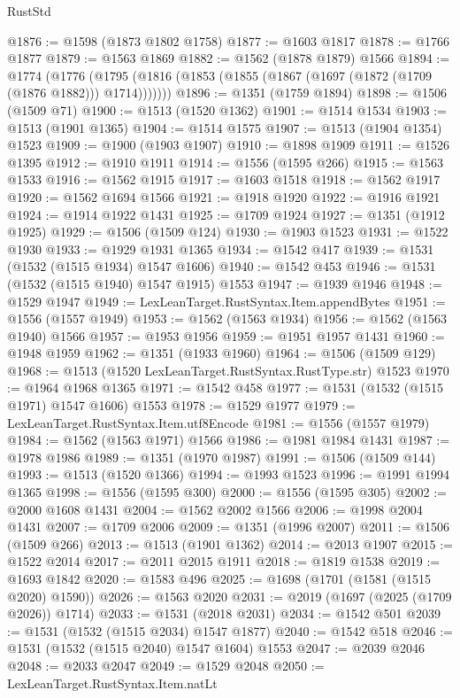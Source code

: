 \begin{lexlean}{RustStd}
\begin{coremodule}
@1876 := @1598 (@1873 @1802 @1758)
@1877 := @1603 @1817
@1878 := @1766 @1877
@1879 := @1563 @1869
@1882 := @1562 (@1878 @1879) @1566
@1894 := @1774
    (@1776 (@1795 (@1816 (@1853 (@1855 (@1867 (@1697 (@1872 (@1709 (@1876 @1882))) @1714)))))))
@1896 := @1351 (@1759 @1894)
@1898 := @1506 (@1509 @71)
@1900 := @1513 (@1520 @1362)
@1901 := @1514 @1534
@1903 := @1513 (@1901 @1365)
@1904 := @1514 @1575
@1907 := @1513 (@1904 @1354) @1523
@1909 := @1900 (@1903 @1907)
@1910 := @1898 @1909
@1911 := @1526 @1395
@1912 := @1910 @1911
@1914 := @1556 (@1595 @266)
@1915 := @1563 @1533
@1916 := @1562 @1915
@1917 := @1603 @1518
@1918 := @1562 @1917
@1920 := @1562 @1694 @1566
@1921 := @1918 @1920
@1922 := @1916 @1921
@1924 := @1914 @1922 @1431
@1925 := @1709 @1924
@1927 := @1351 (@1912 @1925)
@1929 := @1506 (@1509 @124)
@1930 := @1903 @1523
@1931 := @1522 @1930
@1933 := @1929 @1931 @1365
@1934 := @1542 @417
@1939 := @1531 (@1532 (@1515 @1934) @1547 @1606)
@1940 := @1542 @453
@1946 := @1531 (@1532 (@1515 @1940) @1547 @1915) @1553
@1947 := @1939 @1946
@1948 := @1529 @1947
@1949 := LexLeanTarget.RustSyntax.Item.appendBytes
@1951 := @1556 (@1557 @1949)
@1953 := @1562 (@1563 @1934)
@1956 := @1562 (@1563 @1940) @1566
@1957 := @1953 @1956
@1959 := @1951 @1957 @1431
@1960 := @1948 @1959
@1962 := @1351 (@1933 @1960)
@1964 := @1506 (@1509 @129)
@1968 := @1513 (@1520 LexLeanTarget.RustSyntax.RustType.str) @1523
@1970 := @1964 @1968 @1365
@1971 := @1542 @458
@1977 := @1531 (@1532 (@1515 @1971) @1547 @1606) @1553
@1978 := @1529 @1977
@1979 := LexLeanTarget.RustSyntax.Item.utf8Encode
@1981 := @1556 (@1557 @1979)
@1984 := @1562 (@1563 @1971) @1566
@1986 := @1981 @1984 @1431
@1987 := @1978 @1986
@1989 := @1351 (@1970 @1987)
@1991 := @1506 (@1509 @144)
@1993 := @1513 (@1520 @1366)
@1994 := @1993 @1523
@1996 := @1991 @1994 @1365
@1998 := @1556 (@1595 @300)
@2000 := @1556 (@1595 @305)
@2002 := @2000 @1608 @1431
@2004 := @1562 @2002 @1566
@2006 := @1998 @2004 @1431
@2007 := @1709 @2006
@2009 := @1351 (@1996 @2007)
@2011 := @1506 (@1509 @266)
@2013 := @1513 (@1901 @1362)
@2014 := @2013 @1907
@2015 := @1522 @2014
@2017 := @2011 @2015 @1911
@2018 := @1819 @1538
@2019 := @1693 @1842
@2020 := @1583 @496
@2025 := @1698 (@1701 (@1581 (@1515 @2020) @1590))
@2026 := @1563 @2020
@2031 := @2019 (@1697 (@2025 (@1709 @2026)) @1714)
@2033 := @1531 (@2018 @2031)
@2034 := @1542 @501
@2039 := @1531 (@1532 (@1515 @2034) @1547 @1877)
@2040 := @1542 @518
@2046 := @1531 (@1532 (@1515 @2040) @1547 @1604) @1553
@2047 := @2039 @2046
@2048 := @2033 @2047
@2049 := @1529 @2048
@2050 := LexLeanTarget.RustSyntax.Item.natLt

\end{coremodule}
\end{lexlean}
